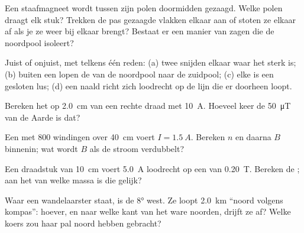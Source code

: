 \begin{exercise}[$\star$]\label{exo:g11:magnetic-fields:1}
Een staafmagneet wordt tussen zijn polen doormidden gezaagd. Welke polen
draagt elk stuk? Trekken de pas gezaagde vlakken elkaar aan of stoten ze
elkaar af als je ze weer bij elkaar brengt? Bestaat er een manier van
zagen die de noordpool isoleert?
\end{exercise}

\begin{exercise}[$\star$]\label{exo:g11:magnetic-fields:2}
Juist of onjuist, met telkens één reden: (a) twee 
snijden elkaar waar het  sterk is; (b) buiten een  lopen de
 van de noordpool naar de zuidpool; (c) elke  is een gesloten lus; (d) een naald richt zich loodrecht op de
lijn die er doorheen loopt.
\end{exercise}

\begin{exercise}[$\star$]\label{exo:g11:magnetic-fields:3}
Bereken het  op \qty{2.0}{cm} van een rechte draad met \qty{10}{A}.
Hoeveel keer de \qty{50}{\micro T} van de Aarde is dat?
\end{exercise}

\begin{exercise}[$\star$]\label{exo:g11:magnetic-fields:4}
Een  met $800$ windingen over \qty{40}{cm} voert
$I = \qty{1.5}{A}$. Bereken $n$ en daarna $B$ binnenin; wat wordt $B$ als
de stroom verdubbelt?
\end{exercise}

\begin{exercise}[$\star$]\label{exo:g11:magnetic-fields:5}
Een draadstuk van \qty{10}{cm} voert \qty{5.0}{A} loodrecht op een 
van \qty{0.20}{T}. Bereken de ; aan het  van welke
massa is die gelijk?
\end{exercise}

\begin{exercise}[$\star\star$]\label{exo:g11:magnetic-fields:6}
Waar een wandelaarster staat, is de  $\ang{8}$ west. Ze loopt
\qty{2.0}{km} ``noord volgens kompas'': hoever, en naar welke kant van
het ware noorden, drijft ze af? Welke koers zou haar pal noord hebben
gebracht?
\end{exercise}

